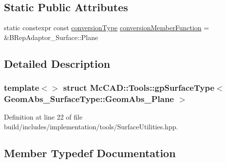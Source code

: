 \subsection*{Static Public Attributes}
\begin{DoxyCompactItemize}
\item 
static constexpr const \hyperlink{structMcCAD_1_1Tools_1_1gpSurfaceType_3_01GeomAbs__SurfaceType_1_1GeomAbs__Plane_01_4_af051c9209de7043f45d15c7394d66710}{conversion\+Type} \hyperlink{structMcCAD_1_1Tools_1_1gpSurfaceType_3_01GeomAbs__SurfaceType_1_1GeomAbs__Plane_01_4_aa3676afddbb387eb819d0ce84dd83210}{conversion\+Member\+Function} = \&B\+Rep\+Adaptor\+\_\+\+Surface\+::\+Plane
\end{DoxyCompactItemize}


\subsection{Detailed Description}
\subsubsection*{template$<$$>$\newline
struct Mc\+C\+A\+D\+::\+Tools\+::gp\+Surface\+Type$<$ Geom\+Abs\+\_\+\+Surface\+Type\+::\+Geom\+Abs\+\_\+\+Plane $>$}



Definition at line 22 of file build/includes/implementation/tools/\+Surface\+Utilities.\+hpp.



\subsection{Member Typedef Documentation}
\mbox{\label{structMcCAD_1_1Tools_1_1gpSurfaceType_3_01GeomAbs__SurfaceType_1_1GeomAbs__Plane_01_4_af051c9209de7043f45d15c7394d66710}} 
